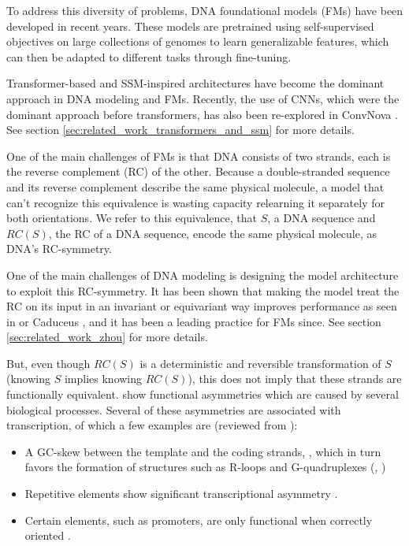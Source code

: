 \documentclass[   ]{article}
\begin{document}
To address this diversity of problems, DNA foundational models (FMs)
have been developed in recent years. These models are pretrained using
self-supervised objectives on large collections of genomes to learn
generalizable features, which can then be adapted to different tasks
through fine-tuning.

Transformer-based and SSM-inspired architectures have become the dominant approach in DNA modeling and FMs. Recently, the use of CNNs, which were the dominant approach before transformers, has also been re-explored in ConvNova \citep{boRevisitingConvolutionArchitecture2025}. See section \ref{sec:related_work_transformers_and_ssm} for more details.

One of the main challenges of FMs is that DNA consists of two strands, each is the reverse complement (RC) of the other. Because a double-stranded sequence and its reverse complement describe the same physical molecule, a model that can't recognize this equivalence is wasting capacity relearning it separately for both orientations. We refer to this equivalence, that $S$, a DNA sequence and $RC(S)$, the RC of a DNA sequence, encode the same physical molecule, as DNA's RC-symmetry.

One of the main challenges of DNA modeling is designing the model architecture to exploit this RC-symmetry. It has been shown that making the model treat the RC on its input in an invariant or equivariant way improves performance as seen in \citet{zhouBetterUnderstandingReverseComplement2021} or Caduceus \citep{schiffCaduceusBiDirectionalEquivariant2024}, and it has been a leading practice for FMs since. See section \ref{sec:related_work_zhou} for more details.

But, even though \(RC(S)\) is a deterministic and reversible transformation of
\(S\) (knowing \(S\) implies knowing \(RC(S)\)), this does not
imply that these strands are functionally equivalent. \citet{moeckelStrandAsymmetriesGenomic2023} show functional asymmetries which are caused by several biological
processes. Several of
these asymmetries are associated with transcription, of which a few examples are (reviewed from \citet{moeckelStrandAsymmetriesGenomic2023}):
\begin{itemize}
	\item A GC-skew between the template and the coding strands,
	\citep{greenTranscriptionassociatedMutationalAsymmetry2003}, which in turn favors the formation of structures such as R-loops and G-quadruplexes
	(\citet{ginnoRloopFormationDistinctive2012},
	\citet{maoDNAGquadruplexStructures2018})
	\item Repetitive elements show significant transcriptional asymmetry
	\citep{georgakopoulos-soaresAsymmetronToolkitIdentification2021}.
	\item Certain elements, such as promoters, are only functional when correctly
	oriented \citep{duttkeHumanPromotersAre2015}.
\end{itemize}
\end{document}

